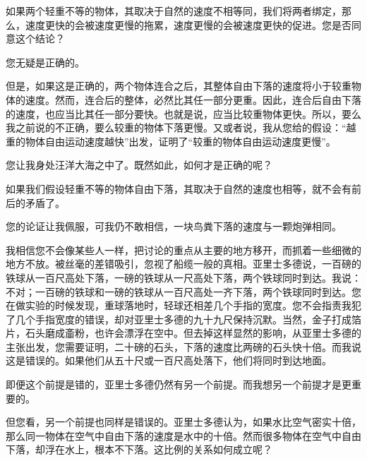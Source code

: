 \documentclass[12pt,UTF-8,openany]{ctexbook}
\begin{document}
\begin{large}
\begin{description}[itemsep=1ex,leftmargin=4.5em,labelwidth=4em]
    \item[{\color{script-2-1} 萨为亚第}]如果两个轻重不等的物体，其取决于自然的速度不相等同，我们将两者绑定，那么，速度更快的会被速度更慢的拖累，速度更慢的会被速度更快的促进。您是否同意这个结论？
    
    \item[{\color{script-2-0} 心朴理休}]您无疑是正确的。
    
    \item[{\color{script-2-1} 萨为亚第}]但是，如果这是正确的，两个物体连合之后，其整体自由下落的速度将小于较重物体的速度。然而，连合后的整体，必然比其任一部分更重。因此，连合后自由下落的速度，也应当比其任一部分要快。也就是说，应当比较重物体更快。所以，要么我之前说的不正确，要么较重的物体下落更慢。又或者说，我从您给的假设：“越重的物体自由运动速度越快”出发，证明了“较重的物体自由运动速度更慢”。
    
    \item[{\color{script-2-0} 心朴理休}]您让我身处汪洋大海之中了。既然如此，如何才是正确的呢？
    
    \item[{\color{script-2-1} 萨为亚第}]如果我们假设轻重不等的物体自由下落，其取决于自然的速度也相等，就不会有前后的矛盾了。
    
    \item[{\color{script-2-0} 心朴理休}]您的论证让我佩服，可我仍不敢相信，一块鸟粪下落的速度与一颗炮弹相同。
    
    \item[{\color{script-2-1} 萨为亚第}]我相信您不会像某些人一样，把讨论的重点从主要的地方移开，而抓着一些细微的地方不放。被丝毫的差错吸引，忽视了船缆一般的真相。亚里士多德说，一百磅的铁球从一百尺高处下落，一磅的铁球从一尺高处下落，两个铁球同时到达。我说：不对；一百磅的铁球和一磅的铁球从一百尺高处一齐下落，两个铁球同时到达。您在做实验的时候发现，重球落地时，轻球还相差几个手指的宽度。您不会指责我犯了几个手指宽度的错误，却对亚里士多德的九十九尺保持沉默。当然，金子打成箔片，石头磨成齑粉，也许会漂浮在空中。但去掉这样显然的影响，从亚里士多德的主张出发，您需要证明，二十磅的石头，下落的速度比两磅的石头快十倍。而我说这是错误的。如果他们从五十尺或一百尺高处落下，他们将同时到达地面。
    
    \item[{\color{script-2-0} 心朴理休}]即便这个前提是错的，亚里士多德仍然有另一个前提。而我想另一个前提才是更重要的。
    
    \item[{\color{script-2-1} 萨为亚第}]但您看，另一个前提也同样是错误的。亚里士多德认为，如果水比空气密实十倍，那么同一物体在空气中自由下落的速度是水中的十倍。然而很多物体在空气中自由下落，却浮在水上，根本不下落。这比例的关系如何成立呢？
    

\end{description}
\end{large}
\end{document}
